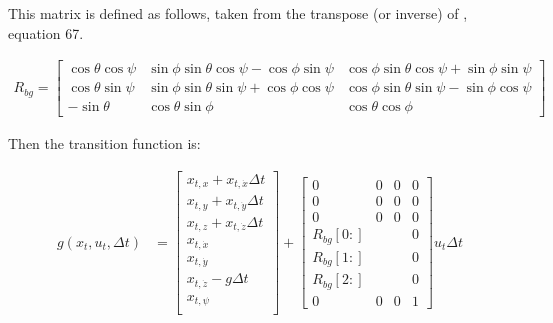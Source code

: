 \documentclass{article}
\begin{document}
This matrix is defined as follows, taken from the transpose (or
inverse) of \citet{diebel2006representing}, equation 67.


\begin{align}
  R_{bg} = \left[\begin{array}{ccc}
      \cos\theta \cos \psi&
      \sin \phi \sin \theta \cos \psi - \cos \phi \sin \psi &
      \cos \phi \sin \theta \cos \psi + \sin \phi \sin \psi\\
      \cos \theta \sin \psi&
      \sin \phi \sin \theta \sin \psi + \cos \phi \cos \psi&
      \cos \phi \sin \theta \sin \psi - \sin \phi \cos \psi \\
      -\sin \theta&
      \cos \theta \sin \phi &
      \cos \theta \cos \phi
      \end{array}\right]
\end{align}

Then the transition function is:

\begin{align}
  g(x_t, u_t, \Delta t) &=
  \left[  \begin{array}{c}
      x_{t,x} +  x_{t,\dot{x}} \Delta t \\
      x_{t,y} +  x_{t,\dot{y}} \Delta t \\
      x_{t,z} + x_{t,\dot{z}} \Delta t\\
      x_{t,\dot{x}} \\
      x_{t,\dot{y}} \\
      x_{t,\dot{z}} - g \Delta t \\
      x_{t, \psi}\\
    \end{array}\right] + 
  \left[ \begin{array}{cccc}
      0&0&0&0\\
      0&0&0&0\\
      0&0&0&0\\
      R_{bg}[0:]&&&0\\
      R_{bg}[1:]&&&0\\
      R_{bg}[2:]&&&0\\
      0&0&0&1
      \end{array}
    \right]   u_t \Delta t
\end{align}
\end{document}
